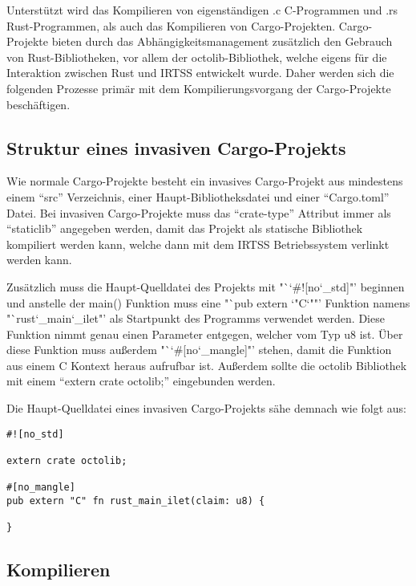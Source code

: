 Unterstützt wird das Kompilieren von eigenständigen .c C-Programmen und .rs Rust-Programmen, als auch das Kompilieren von
Cargo-Projekten. Cargo-Projekte bieten durch das Abhängigkeitsmanagement zusätzlich den Gebrauch von Rust-Bibliotheken, vor
allem der octolib-Bibliothek, welche eigens für die Interaktion zwischen Rust und IRTSS entwickelt wurde. Daher werden sich die
folgenden Prozesse primär mit dem Kompilierungsvorgang der Cargo-Projekte beschäftigen.

\subsection{Struktur eines invasiven Cargo-Projekts}

Wie normale Cargo-Projekte besteht ein invasives Cargo-Projekt aus mindestens einem "`src"' Verzeichnis, einer Haupt-Bibliotheksdatei
und einer "`Cargo.toml"' Datei. Bei invasiven Cargo-Projekte muss das "`crate-type"' Attribut immer als "`staticlib"' angegeben werden,
damit das Projekt als statische Bibliothek kompiliert werden kann, welche dann mit dem IRTSS Betriebssystem verlinkt werden kann.

Zusätzlich muss die Haupt-Quelldatei des Projekts mit "`\char`#![no\char`_std]"' beginnen und anstelle der main()
Funktion muss eine "`pub extern \char`"C\char`""' Funktion namens "`rust\char`_main\char`_ilet"' als Startpunkt des Programms
verwendet werden.
Diese Funktion nimmt genau einen Parameter entgegen, welcher vom Typ u8 ist.
Über diese  Funktion muss außerdem "`\char`#[no\char`_mangle]"' stehen, damit die Funktion aus einem C Kontext heraus
aufrufbar ist.
Außerdem sollte die octolib Bibliothek mit einem "`extern crate octolib;"' eingebunden werden.

Die Haupt-Quelldatei eines invasiven Cargo-Projekts sähe demnach wie folgt aus:
\begin{verbatim}
#![no_std]

extern crate octolib;

#[no_mangle]
pub extern "C" fn rust_main_ilet(claim: u8) {

}
\end{verbatim}

\subsection{Kompilieren}

